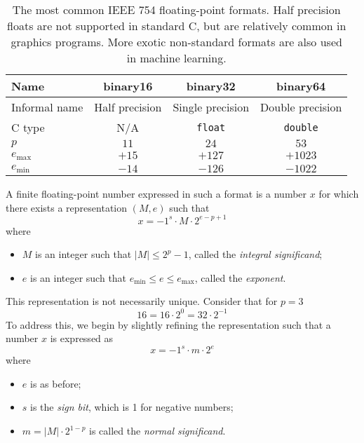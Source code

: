 \begin{table}
  \centering
  \begin{tabular}{|l||c|c|c|}
    \hline
    Name & binary16 & binary32 & binary64 \\\hline
    Informal name & Half precision & Single precision & Double precision \\\hline
    C type & N/A & \texttt{float} & \texttt{double} \\\hline
    $p$ & $11$ & $24$ & $53$ \\\hline
    $e_{\text{max}}$ & $+15$ & $+127$ & $+1023$ \\\hline
    $e_{\text{min}}$ & $-14$ & $-126$ & $-1022$ \\\hline
  \end{tabular}
  \caption{The most common IEEE 754 floating-point formats.  Half
    precision floats are not supported in standard C, but are
    relatively common in graphics programs.  More exotic non-standard
    formats are also used in machine learning.}
  \label{tab:ieee-formats}
\end{table}

A finite floating-point number expressed in such a format is a number
$x$ for which there exists a representation $(M,e)$ such that
\begin{equation}
  x = -1^{s} \cdot{} M \cdot{} 2^{e-p+1}
\end{equation}
where
\begin{itemize}
\item $M$ is an integer such that $|M| \leq 2^{p}-1$, called the
  \emph{integral significand};
\item $e$ is an integer such that
  $e_{\text{min}} \leq e \leq e_{\text{max}}$, called the
  \emph{exponent}.
\end{itemize}
This representation is not necessarily unique.  Consider that for
$p=3$
\begin{equation}
  16 = 16\cdot{}2^{0} = 32\cdot{}2^{-1}
\end{equation}
To address this, we begin by slightly refining the representation such
that a number $x$ is expressed as
\begin{equation}
  x = -1^{s} \cdot{} m \cdot{} 2^e
\end{equation}
where
\begin{itemize}
\item $e$ is as before;
\item $s$ is the \emph{sign bit}, which is 1 for negative numbers;
\item $m=|M|\cdot{}2^{1-p}$ is called the \emph{normal significand}.
\end{itemize}

